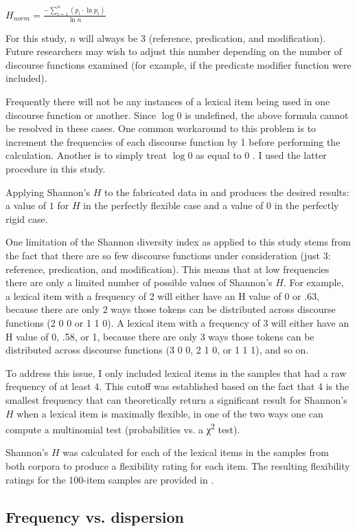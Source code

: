 \begin{exe}
  \ex\label{ex:Shannon-H}
  $H_{norm} = \displaystyle\frac{-\displaystyle\sum_{i = 1}^{n}(p_i \cdot \ln p_i)}{\ln n}$
\end{exe}

\noindent For this study, $n$ will always be $3$ (reference, predication, and modification). Future researchers may wish to adjust this number depending on the number of discourse functions examined (for example, if the predicate modifier function were included).

Frequently there will not be any instances of a lexical item being used in one discourse function or another. Since $\log 0$ is undefined, the above formula cannot be resolved in these cases. One common workaround to this problem is to increment the frequencies of each discourse function by 1 before performing the calculation. Another is to simply treat $\log 0$ as equal to $0$ \parencite[120--121]{Gries2013}. I used the latter procedure in this study.

Applying Shannon's $H$ to the fabricated data in  and  produces the desired results: a value of $1$ for $H$ in the perfectly flexible case and a value of $0$ in the perfectly rigid case.

One limitation of the Shannon diversity index as applied to this study stems from the fact that there are so few discourse functions under consideration (just 3: reference, predication, and modification). This means that at low frequencies there are only a limited number of possible values of Shannon's $H$. For example, a lexical item with a frequency of 2 will either have an H value of 0 or .63, because there are only 2 ways those tokens can be distributed across discourse functions (2 0 0 or 1 1 0). A lexical item with a frequency of 3 will either have an H value of 0, .58, or 1, because there are only 3 ways those tokens can be distributed across discourse functions (3 0 0, 2 1 0, or 1 1 1), and so on.

To address this issue, I only included lexical items in the samples that had a raw frequency of at least 4. This cutoff was established based on the fact that 4 is the smallest frequency that can theoretically return a significant result for Shannon's $H$ when a lexical item is maximally flexible, in one of the two ways one can compute a multinomial test (probabilities vs. a χ\textsuperscript{2} test).

Shannon's $H$ was calculated for each of the lexical items in the samples from both corpora to produce a flexibility rating for each item. The resulting flexibility ratings for the 100-item samples are provided in .

\subsection{Frequency vs. dispersion}
\label{sec:3.4.2}
